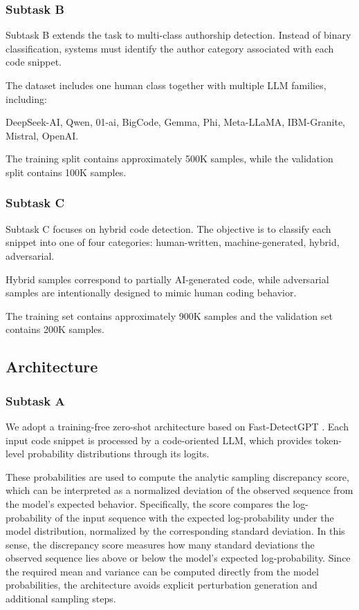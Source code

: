 \documentclass[11pt]{article}
\begin{document}
\subsubsection{ Subtask B}

Subtask B extends the task to multi-class authorship detection. Instead of binary classification, systems must identify the author category associated with each code snippet.

The dataset includes one human class together with multiple LLM families, including:

DeepSeek-AI, Qwen, 01-ai, BigCode, Gemma, Phi, Meta-LLaMA, IBM-Granite, Mistral, OpenAI.

The training split contains approximately 500K samples, while the validation split contains 100K samples.

\subsubsection{ Subtask C}

Subtask C focuses on hybrid code detection. The objective is to classify each snippet into one of four categories: human-written, machine-generated, hybrid, adversarial.

Hybrid samples correspond to partially AI-generated code, while adversarial samples are intentionally designed to mimic human coding behavior.

The training set contains approximately 900K samples and the validation set contains 200K samples.

\subsection{Architecture}
\subsubsection{Subtask A}

We adopt a training-free zero-shot architecture based on Fast-DetectGPT \cite{bao2024fastdetectgptefficientzeroshotdetection}. Each input code snippet is processed by a code-oriented LLM, which provides token-level probability distributions through its logits.

These probabilities are used to compute the analytic sampling discrepancy score, which can be interpreted as a normalized deviation of the observed sequence from the model's expected behavior. Specifically, the score compares the log-probability of the input sequence with the expected log-probability under the model distribution, normalized by the corresponding standard deviation. In this sense, the discrepancy score measures how many standard deviations the observed sequence lies above or below the model's expected log-probability. Since the required mean and variance can be computed directly from the model probabilities, the architecture avoids explicit perturbation generation and additional sampling steps.
\end{document}
